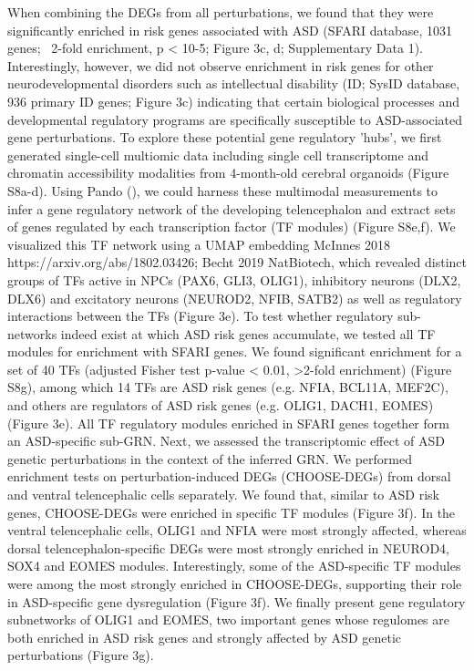 When combining the DEGs from all perturbations, we found that they were significantly enriched in risk genes associated with ASD (SFARI database, 1031 genes; ~2-fold enrichment, p < 10-5; Figure 3c, d; Supplementary Data 1). Interestingly, however, we did not observe enrichment in risk genes for other neurodevelopmental disorders such as intellectual disability (ID; SysID database, 936 primary ID genes; Figure 3c) indicating that certain biological processes and developmental regulatory programs are specifically susceptible to ASD-associated gene perturbations. To explore these potential gene regulatory 'hubs', we first generated single-cell multiomic data including single cell transcriptome and chromatin accessibility modalities from 4-month-old cerebral organoids (Figure S8a-d). Using Pando (\cite{fleck_inferring_2021}), we could harness these multimodal measurements to infer a gene regulatory network of the developing telencephalon and extract sets of genes regulated by each transcription factor (TF modules) (Figure S8e,f). We visualized this TF network using a UMAP embedding {McInnes 2018 https://arxiv.org/abs/1802.03426; Becht 2019 NatBiotech}, which revealed distinct groups of TFs active in NPCs (PAX6, GLI3, OLIG1), inhibitory neurons (DLX2, DLX6) and excitatory neurons (NEUROD2, NFIB, SATB2) as well as regulatory interactions between the TFs (Figure 3e). 
To test whether regulatory sub-networks indeed exist at which ASD risk genes accumulate, we tested all TF modules for enrichment with SFARI genes. We found significant enrichment for a set of 40 TFs (adjusted Fisher test p-value < 0.01, >2-fold enrichment) (Figure S8g), among which 14 TFs are ASD risk genes (e.g. NFIA, BCL11A, MEF2C), and others are regulators of ASD risk genes (e.g. OLIG1, DACH1, EOMES) (Figure 3e). All TF regulatory modules enriched in SFARI genes together form an ASD-specific sub-GRN.
Next, we assessed the transcriptomic effect of ASD genetic perturbations in the context of the inferred GRN. We performed enrichment tests on perturbation-induced DEGs (CHOOSE-DEGs) from dorsal and ventral telencephalic cells separately. We found that, similar to ASD risk genes, CHOOSE-DEGs were enriched in specific TF modules (Figure 3f). In the ventral telencephalic cells, OLIG1 and NFIA were most strongly affected, whereas dorsal telencephalon-specific DEGs were most strongly enriched in NEUROD4, SOX4 and EOMES modules. Interestingly, some of the ASD-specific TF modules were among the most strongly enriched in CHOOSE-DEGs, supporting their role in ASD-specific gene dysregulation (Figure 3f). We finally present gene regulatory subnetworks of OLIG1 and EOMES, two important genes whose regulomes are both enriched in ASD risk genes and strongly affected by ASD genetic perturbations (Figure 3g). 
